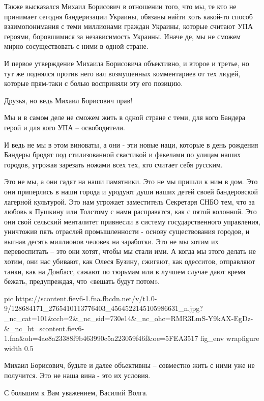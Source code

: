 Также высказался Михаил Борисович в отношении того, что мы, те кто не принимает
сегодня бандеризации Украины, обязаны найти хоть какой-то способ
взаимопонимания с теми миллионами граждан Украины, которые считают УПА героями,
боровшимися за независимость Украины. Иначе де, мы не сможем мирно
сосуществовать с ними в одной стране. 

И первое утверждение Михаила Борисовича объективно, и второе и третье, но тут
же поднялся против него вал возмущенных комментариев от тех людей, которые
прям-таки с болью восприняли эту его позицию. 

Друзья, но ведь Михаил Борисович прав!

Мы и в самом деле не сможем жить в одной стране с теми, для кого Бандера герой
и для кого УПА – освободители. 

И ведь не мы в этом виноваты, а они - эти новые наци, которые в день рождения
Бандеры бродят под стилизованной свастикой и факелами по улицам наших городов,
угрожая зарезать ножами всех тех, кто считает себя русским. 

Это не мы, а они гадят на наши памятники. Это не мы пришли к ним в дом. Это они
приперлись в наши города и уродуют души наших детей своей бандеровской лагерной
культурой. Это нам угрожает заместитель Секретаря СНБО тем, что за любовь к
Пушкину или Толстому с нами расправятся, как с пятой колонной. Это они свой
сельский менталитет привнесли в систему государственного управления, уничтожив
пять отраслей промышленности - основу существования городов, и выгнав десять
миллионов человек на заработки. Это не мы хотим их перевоспитать – это они
хотят, чтобы мы стали ими. А когда мы этого делать не хотим, они нас убивают,
как Олеся Бузину, сжигают, как одесситов, отправляют танки, как на Донбасс,
сажают по тюрьмам или в лучшем случае дают время бежать, предупреждая, что
«вешать будут потом». 

\ifcmt
pic https://scontent.fiev6-1.fna.fbcdn.net/v/t1.0-9/128684171_2765410113776403_4564522145105986631_n.jpg?_nc_cat=101&ccb=2&_nc_sid=730e14&_nc_ohc=RMR3LmS-Y9kAX-EgDz-&_nc_ht=scontent.fiev6-1.fna&oh=4ae8a23388f9b463990c5a223059f46f&oe=5FEA3517
fig_env wrapfigure
width 0.5
\fi

Михаил Борисович, будьте и далее объективны – совместно жить с ними уже не
получится. Это не наша вина - это их условия. 

С большим к Вам уважением, Василий Волга.
